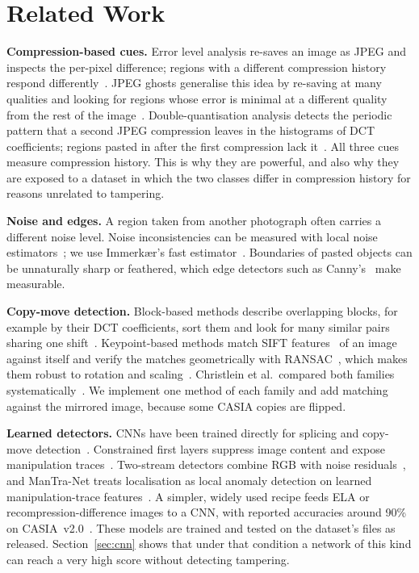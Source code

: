 \section{Related Work}\label{sec:related}

\textbf{Compression-based cues.} Error level analysis re-saves an image as JPEG and inspects the per-pixel
difference; regions with a different compression history respond differently~\cite{krawetz2007ela}. JPEG ghosts
generalise this idea by re-saving at many qualities and looking for regions whose error is minimal at a different
quality from the rest of the image~\cite{farid2009ghost}. Double-quantisation analysis detects the periodic
pattern that a second JPEG compression leaves in the histograms of DCT coefficients; regions pasted in after the
first compression lack it~\cite{popescu2004stats,lin2009dq,bianchi2012dq}. All three cues measure compression
history. This is why they are powerful, and also why they are exposed to a dataset in which the two classes differ
in compression history for reasons unrelated to tampering.

\textbf{Noise and edges.} A region taken from another photograph often carries a different noise level. Noise
inconsistencies can be measured with local noise estimators~\cite{mahdian2009noise}; we use Immerk{\ae}r's fast
estimator~\cite{immerkaer1996noise}. Boundaries of pasted objects can be unnaturally sharp or feathered, which
edge detectors such as Canny's~\cite{canny1986} make measurable.

\textbf{Copy-move detection.} Block-based methods describe overlapping blocks, for example by their DCT
coefficients, sort them and look for many similar pairs sharing one shift~\cite{fridrich2003copymove}.
Keypoint-based methods match SIFT features~\cite{lowe2004sift} of an image against itself and verify the matches
geometrically with RANSAC~\cite{fischler1981ransac}, which makes them robust to rotation and
scaling~\cite{amerini2011sift}. Christlein et al.\ compared both families systematically~\cite{christlein2012eval}.
We implement one method of each family and add matching against the mirrored image, because some CASIA copies are
flipped.

\textbf{Learned detectors.} CNNs have been trained directly for splicing and copy-move
detection~\cite{rao2016cnn}. Constrained first layers suppress image content and expose manipulation
traces~\cite{bayar2016constrained}. Two-stream detectors combine RGB with noise residuals~\cite{zhou2018rgbn}, and
ManTra-Net treats localisation as local anomaly detection on learned manipulation-trace
features~\cite{wu2019mantra}. A simpler, widely used
recipe feeds ELA or recompression-difference images to a CNN, with reported accuracies around 90\% on
CASIA~v2.0~\cite{sudiatmika2019ela,ali2022recompress}. These models are trained and tested on the dataset's files
as released. Section~\ref{sec:cnn} shows that under that condition a network of this kind can reach a very high
score without detecting tampering.

